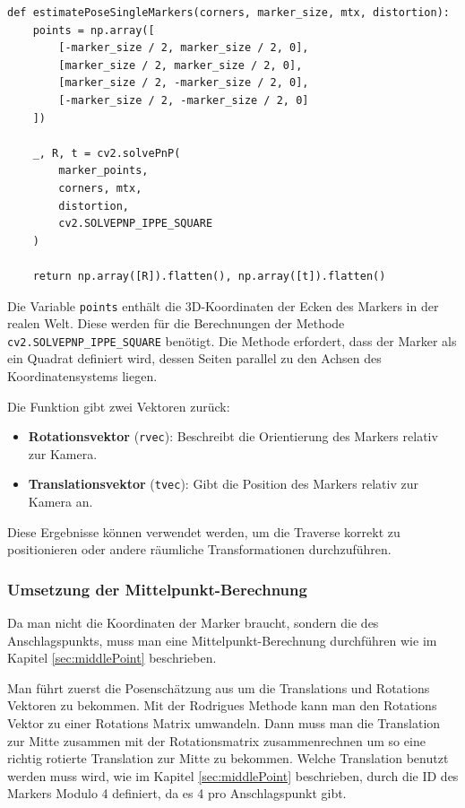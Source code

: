 

\begin{lstlisting}
def estimatePoseSingleMarkers(corners, marker_size, mtx, distortion):
    points = np.array([
        [-marker_size / 2, marker_size / 2, 0],
        [marker_size / 2, marker_size / 2, 0],
        [marker_size / 2, -marker_size / 2, 0],
        [-marker_size / 2, -marker_size / 2, 0]
    ])

    _, R, t = cv2.solvePnP(
        marker_points, 
        corners, mtx, 
        distortion,
        cv2.SOLVEPNP_IPPE_SQUARE
    )
    
    return np.array([R]).flatten(), np.array([t]).flatten()
\end{lstlisting}

Die Variable \texttt{points} enthält die 3D-Koordinaten der Ecken des Markers in der realen Welt. 
Diese werden für die Berechnungen der Methode  \texttt{cv2.SOLVEPNP\_IPPE\_SQUARE} benötigt. 
Die Methode erfordert, dass der Marker als ein Quadrat definiert wird, dessen Seiten parallel 
zu den Achsen des Koordinatensystems liegen.

Die Funktion gibt zwei Vektoren zurück:
\begin{itemize}
    \item \textbf{Rotationsvektor} (\texttt{rvec}): Beschreibt die Orientierung des Markers relativ zur Kamera.
    \item \textbf{Translationsvektor} (\texttt{tvec}): Gibt die Position des Markers relativ zur Kamera an.
\end{itemize}

Diese Ergebnisse können verwendet werden, um die Traverse korrekt zu positionieren oder andere 
räumliche Transformationen durchzuführen.


\subsubsection{Umsetzung der Mittelpunkt-Berechnung}

Da man nicht die Koordinaten der Marker braucht, sondern die des Anschlagspunkts, muss man eine 
Mittelpunkt-Berechnung durchführen wie im Kapitel \ref{sec:middlePoint} beschrieben.

Man führt zuerst die Posenschätzung aus um die Translations und Rotations Vektoren zu bekommen.
Mit der Rodrigues Methode kann man den Rotations Vektor zu einer Rotations Matrix umwandeln.
Dann muss man die Translation zur Mitte zusammen mit der Rotationsmatrix zusammenrechnen um so eine richtig rotierte Translation zur Mitte zu bekommen.
Welche Translation benutzt werden muss wird, wie im Kapitel \ref{sec:middlePoint} beschrieben, durch die ID des Markers Modulo 4 definiert, da es 4 pro Anschlagspunkt gibt.

